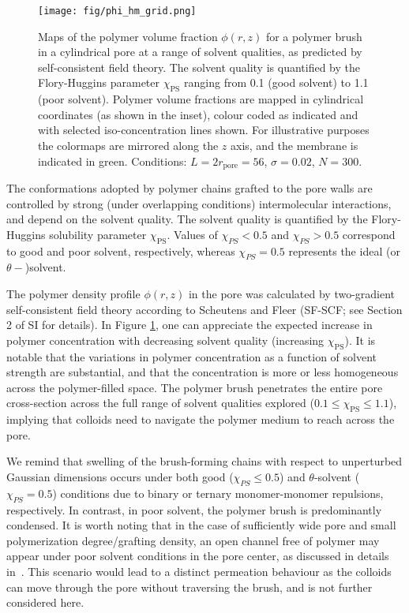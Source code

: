 \documentclass[12pt, a4paper]{article}
\begin{document}
\begin{figure}
    \centering
    \texttt{[image: fig/phi\_hm\_grid.png]}
    \caption{
    Maps of the polymer volume fraction $\phi(r,z)$ for a polymer brush in a cylindrical pore at a range of solvent qualities, as predicted by self-consistent field theory. 
    The solvent quality is quantified by the Flory-Huggins parameter $\chi_{\text{PS}}$ ranging from 0.1 (good solvent) to 1.1 (poor solvent).
    Polymer volume fractions are mapped in cylindrical coordinates (as shown in the inset), colour coded as indicated and with selected iso-concentration lines shown. 
    For illustrative purposes the colormaps are mirrored along the $z$ axis, and the membrane is indicated in green.
    Conditions: $L=2r_{\text{pore}}=56$, $\sigma=0.02$, $N=300$.
    }
    \label{fig:phi_hm_grid}
\end{figure}

The conformations adopted by polymer chains grafted to the pore walls are controlled by strong (under overlapping conditions) intermolecular interactions, and depend on the solvent quality. 
The solvent quality is quantified by the Flory-Huggins solubility parameter $\chi_{\text{PS}}$. 
Values of $\chi_{PS}<0.5$ and $\chi_{PS}>0.5$ correspond to good and poor solvent, respectively, whereas $\chi_{PS}=0.5$ represents the ideal (or $\theta-$)solvent.

The polymer density profile $\phi(r,z)$ in the pore was calculated by two-gradient self-consistent field theory according to Scheutens and Fleer 
(SF-SCF; see Section 2 of SI for details).
In Figure \ref{fig:phi_hm_grid}, one can appreciate the expected increase in polymer concentration with decreasing solvent quality (increasing $\chi_{\text{PS}}$). 
It is notable that the variations in polymer concentration as a function of solvent strength are substantial, 
and that the concentration is more or less homogeneous across the polymer-filled space. 
The polymer brush penetrates the entire pore cross-section across the full range of solvent qualities explored ($0.1\le\chi_{\text{PS}}\le1.1$), 
implying that colloids need to navigate the polymer medium to reach across the pore.

We remind that swelling of the brush-forming chains with respect to unperturbed Gaussian dimensions occurs under both good ($\chi_{PS} \leq 0.5$) and $\theta$-solvent ($\chi_{PS}= 0.5$) conditions due to binary or ternary monomer-monomer repulsions, respectively.
In contrast, in poor solvent, the polymer brush is predominantly condensed.
It is worth noting that in the case of sufficiently wide pore and small polymerization degree/grafting density, 
an open channel free of polymer may appear under poor solvent conditions in the pore center, as discussed in details in~\cite{Laktionov2021}. 
This scenario would lead to a distinct permeation behaviour as the colloids can move through the pore without traversing the brush, and is not further considered here. 
\end{document}
